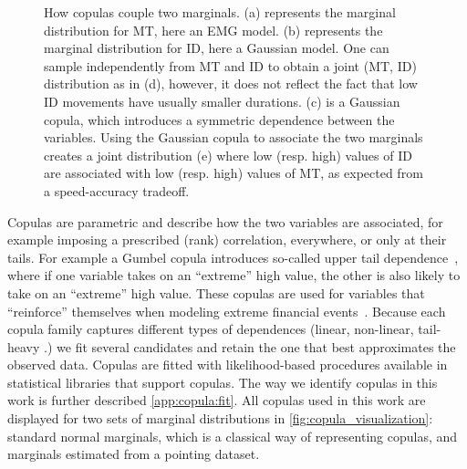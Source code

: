 \documentclass[acmlarge, manuscript,review]{acmart}
\begin{document}
\begin{figure}[htbp]
	\centering
	\caption{How copulas couple two marginals. (a) represents the marginal distribution for MT, here an EMG model. (b) represents the marginal distribution for ID, here a Gaussian model. One can sample independently from MT and ID to obtain a joint (MT, ID) distribution as in (d), however, it does not reflect the fact that low ID movements have usually smaller durations. (c) is a Gaussian copula, which introduces a symmetric dependence between the variables. Using the Gaussian copula to associate the two marginals creates a joint distribution (e) where low (resp. high) values of ID are associated with low (resp. high) values of MT, as expected from a speed-accuracy tradeoff.}
	\label{fig:copulas_explained}
\end{figure}



Copulas are parametric and describe how the two variables are associated, for example imposing a prescribed (rank) correlation, everywhere, or only at their tails.
For example a Gumbel copula introduces so-called upper tail dependence~\cite{nelsen2006}, where if one variable takes on an ``extreme'' high value, the other is also likely to take on an ``extreme'' high value. These copulas are used for variables that ``reinforce'' themselves \eg when modeling extreme financial events~\cite{dewick2022}.
Because each copula family captures different types of dependences (linear, non-linear, tail-heavy \etc.) we fit several candidates and retain the one that best approximates the observed data. Copulas are fitted with likelihood-based procedures available in statistical libraries that support copulas.
The way we identify copulas in this work is further described \autoref{app:copula:fit}. All copulas used in this work are displayed for two sets of marginal distributions in \autoref{fig:copula_visualization}: standard normal marginals, which is a classical way of representing copulas, and marginals estimated from a pointing dataset. 
\end{document}
